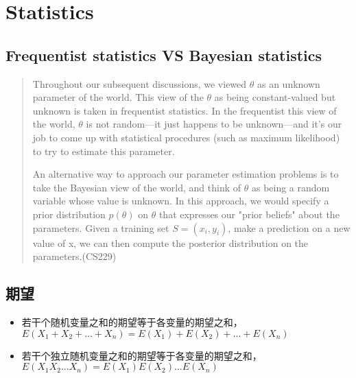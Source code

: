 \chapter{Statistics}

\section{Frequentist statistics VS Bayesian statistics}
\begin{quotation}
Throughout our subsequent discussions, we viewed $\theta$ as an unknown parameter of the world. 
This view of the $\theta$ as being constant-valued but unknown is taken in frequentist statistics.
In the frequentist this view of the world, $\theta$ is not random—it just happens to be unknown—and 
it's our job to come up with statistical procedures (such as maximum likelihood) to try to estimate 
this parameter. 

An alternative way to approach our parameter estimation problems is to take 
the Bayesian view of the world, and think of $\theta$ as being a random variable whose value is 
unknown. In this approach, we would specify a prior distribution $p(\theta)$ on $\theta$ that 
expresses our "prior beliefs" about the parameters. Given a training set $S = {(x_i, y_i)}$, 
make a prediction on a new value of x, we can then compute the posterior distribution on 
the parameters.(CS229)
\end{quotation}

\section{期望}
\begin{itemize}
    \item 若干个随机变量之和的期望等于各变量的期望之和，$E(X_1 + X_2 + ... + X_n) = E(X_1) + E(X_2) + ... + E(X_n)$
    \item 若干个独立随机变量之和的期望等于各变量的期望之和，$E(X_1 X_2 ... X_n) = E(X_1)E(X_2)...E(X_n)$
\end{itemize}
